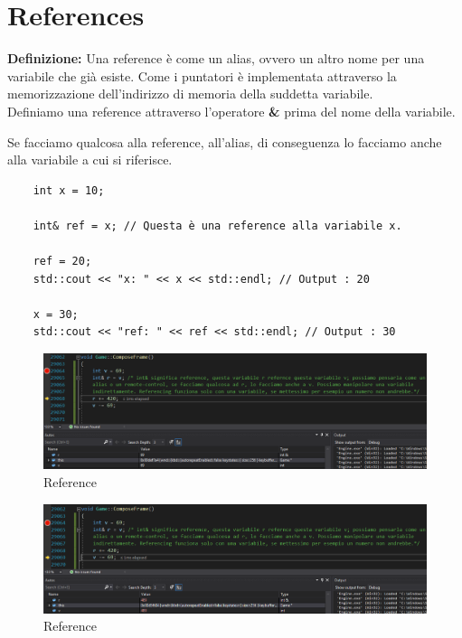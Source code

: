 \section{References}

\textsf{\small \textbf{Definizione: } Una reference è come un alias, ovvero un altro nome per una variabile che già esiste. Come i puntatori è implementata attraverso la memorizzazione dell'indirizzo di memoria della suddetta variabile.} \\

\textsf{\small Definiamo una reference attraverso l'operatore \textbf{\&} prima del nome della variabile.}

\textsf{\small Se facciamo qualcosa alla reference, all'alias, di conseguenza lo facciamo anche alla variabile a cui si riferisce.} \\

\begin{lstlisting}
	int x = 10;
	
	int& ref = x; // Questa è una reference alla variabile x.
	
	ref = 20;
	std::cout << "x: " << x << std::endl; // Output : 20
	
	x = 30;
	std::cout << "ref: " << ref << std::endl; // Output : 30
\end{lstlisting}

\begin{figure}[ht]
	\centering
	\includegraphics[width=1.2\textwidth, height=1.2\textheight, keepaspectratio]{./imgs/References.png}
	\caption{Reference}
	\label{fig:references1}
\end{figure}

\begin{figure}[ht]
	\centering
	\includegraphics[width=1.2\textwidth, height=1.2\textheight, keepaspectratio]{./imgs/References2.png}
	\caption{Reference}
	\label{fig:references2}
\end{figure}

